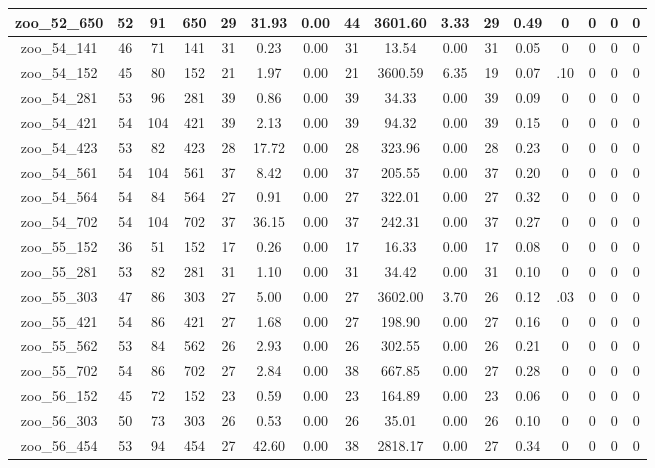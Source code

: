 \begin{landscape}
\begin{longtable}{|c|c|c|c|c|c|c|c|c|c|c|c|c|c|c|c|}
zoo\_52\_650 & 52 & 91 & 650 & 29 & 31.93 & 0.00 & 44 & 3601.60 & 3.33 & 29 & 0.49 & 0 & 0 & 0 & 0 \\ \hline 
zoo\_54\_141 & 46 & 71 & 141 & 31 & 0.23 & 0.00 & 31 & 13.54 & 0.00 & 31 & 0.05 & 0 & 0 & 0 & 0 \\ \hline 
zoo\_54\_152 & 45 & 80 & 152 & 21 & 1.97 & 0.00 & 21 & 3600.59 & 6.35 & 19 & 0.07 & .10 & 0 & 0 & 0 \\ \hline 
zoo\_54\_281 & 53 & 96 & 281 & 39 & 0.86 & 0.00 & 39 & 34.33 & 0.00 & 39 & 0.09 & 0 & 0 & 0 & 0 \\ \hline 
zoo\_54\_421 & 54 & 104 & 421 & 39 & 2.13 & 0.00 & 39 & 94.32 & 0.00 & 39 & 0.15 & 0 & 0 & 0 & 0 \\ \hline 
zoo\_54\_423 & 53 & 82 & 423 & 28 & 17.72 & 0.00 & 28 & 323.96 & 0.00 & 28 & 0.23 & 0 & 0 & 0 & 0 \\ \hline 
zoo\_54\_561 & 54 & 104 & 561 & 37 & 8.42 & 0.00 & 37 & 205.55 & 0.00 & 37 & 0.20 & 0 & 0 & 0 & 0 \\ \hline 
zoo\_54\_564 & 54 & 84 & 564 & 27 & 0.91 & 0.00 & 27 & 322.01 & 0.00 & 27 & 0.32 & 0 & 0 & 0 & 0 \\ \hline 
zoo\_54\_702 & 54 & 104 & 702 & 37 & 36.15 & 0.00 & 37 & 242.31 & 0.00 & 37 & 0.27 & 0 & 0 & 0 & 0 \\ \hline 
zoo\_55\_152 & 36 & 51 & 152 & 17 & 0.26 & 0.00 & 17 & 16.33 & 0.00 & 17 & 0.08 & 0 & 0 & 0 & 0 \\ \hline 
zoo\_55\_281 & 53 & 82 & 281 & 31 & 1.10 & 0.00 & 31 & 34.42 & 0.00 & 31 & 0.10 & 0 & 0 & 0 & 0 \\ \hline 
zoo\_55\_303 & 47 & 86 & 303 & 27 & 5.00 & 0.00 & 27 & 3602.00 & 3.70 & 26 & 0.12 & .03 & 0 & 0 & 0 \\ \hline 
zoo\_55\_421 & 54 & 86 & 421 & 27 & 1.68 & 0.00 & 27 & 198.90 & 0.00 & 27 & 0.16 & 0 & 0 & 0 & 0 \\ \hline 
zoo\_55\_562 & 53 & 84 & 562 & 26 & 2.93 & 0.00 & 26 & 302.55 & 0.00 & 26 & 0.21 & 0 & 0 & 0 & 0 \\ \hline 
zoo\_55\_702 & 54 & 86 & 702 & 27 & 2.84 & 0.00 & 38 & 667.85 & 0.00 & 27 & 0.28 & 0 & 0 & 0 & 0 \\ \hline 
zoo\_56\_152 & 45 & 72 & 152 & 23 & 0.59 & 0.00 & 23 & 164.89 & 0.00 & 23 & 0.06 & 0 & 0 & 0 & 0 \\ \hline 
zoo\_56\_303 & 50 & 73 & 303 & 26 & 0.53 & 0.00 & 26 & 35.01 & 0.00 & 26 & 0.10 & 0 & 0 & 0 & 0 \\ \hline 
zoo\_56\_454 & 53 & 94 & 454 & 27 & 42.60 & 0.00 & 38 & 2818.17 & 0.00 & 27 & 0.34 & 0 & 0 & 0 & 0 \\ \hline 

\end{longtable}
\end{landscape}

